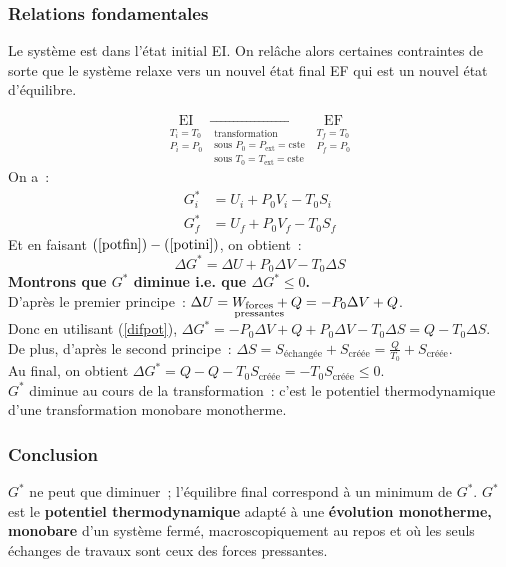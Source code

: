 \documentclass{article}
\let\oldref\ref
\renewcommand{\ref}[1]{(\oldref{#1})}
\newcommand{\ext}{\text{ext}}
\newcommand{\cste}{\text{cste}}
\newcommand{\EI}{\mathrm{EI}}
\newcommand{\EF}{\mathrm{EF}}
\newcommand{\fp}{{\substack{\text{forces}\\\mathclap{\text{pressantes}}}}}
\newcommand{\creee}{\text{créée}}
\newcommand{\echangee}{\text{échangée}}
\begin{document}
\subsubsection{Relations fondamentales}
Le système est dans l'état initial EI. On relâche alors certaines contraintes de sorte que le système relaxe vers un nouvel état final EF qui est un nouvel état d'équilibre.
\begin{tableau}
    $$\underset{\substack{T_i=T_0\\P_i=P_0}}{\EI} \xrightarrow[\substack{\text{transformation}\\\text{sous } P_0=P_\ext=\cste\\\text{sous } T_0=T_\ext = \cste}]{} \underset{\substack{T_f=T_0\\P_f=P_0}}{\EF}$$
    On a~:
    \begin{align}
        G_i^* &= U_i + P_0V_i - T_0S_i \label{potini}\\
        G_f^* &= U_f + P_0V_f - T_0S_f \label{potfin}
    \end{align}
    Et en faisant $\ref{potfin}-\ref{potini}$, on obtient~:
    \begin{equation}\label{difpot}
        \Delta G^* = \Delta U + P_0\Delta V - T_0\Delta S    
    \end{equation}
    \tcbline
    \textbf{Montrons que $G^*$ diminue i.e. que $\Delta G^* \leq 0$.}\\
    
    D'après le premier principe~: $\Delta U = W_{\fp} + Q = -P_0\Delta V + Q$.\\
    Donc en utilisant \ref{difpot}, $\Delta G^* = -P_0\Delta V + Q + P_0\Delta V - T_0\Delta S = Q-T_0\Delta S$.\\
    De plus, d'après le second principe~: $\Delta S = S_\echangee + S_\creee = \frac{Q}{T_0} + S_\creee$.\\
    
    Au final, on obtient $\Delta G^* = Q-Q-T_0S_\creee = -T_0S_\creee \leq 0$.\\
    
    $G^*$ diminue au cours de la transformation~: c'est le potentiel thermodynamique d'une transformation monobare monotherme.
\end{tableau}

\subsubsection{Conclusion}
\begin{important}
    $G^*$ ne peut que diminuer~; l'équilibre final correspond à un minimum de $G^*$. $G^*$ est le \textbf{potentiel thermodynamique} adapté à une \textbf{évolution monotherme, monobare} d'un système fermé, macroscopiquement au repos et où les seuls échanges de travaux sont ceux des forces pressantes.
\end{important}
\end{document}

